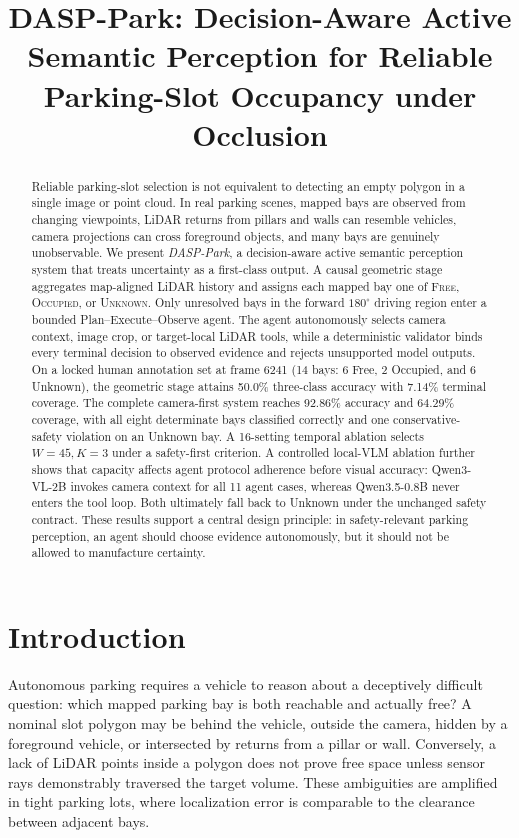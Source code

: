 \documentclass[conference]{IEEEtran}
\title{DASP-Park: Decision-Aware Active Semantic Perception for Reliable Parking-Slot Occupancy under Occlusion}
\author{\IEEEauthorblockN{Anonymous Author(s)}
\IEEEauthorblockA{Author information withheld for manuscript preparation}}
\begin{document}
\maketitle

\begin{abstract}
Reliable parking-slot selection is not equivalent to detecting an empty polygon in a single image or point cloud. In real parking scenes, mapped bays are observed from changing viewpoints, LiDAR returns from pillars and walls can resemble vehicles, camera projections can cross foreground objects, and many bays are genuinely unobservable. We present \emph{DASP-Park}, a decision-aware active semantic perception system that treats uncertainty as a first-class output. A causal geometric stage aggregates map-aligned LiDAR history and assigns each mapped bay one of \textsc{Free}, \textsc{Occupied}, or \textsc{Unknown}. Only unresolved bays in the forward $180^{\circ}$ driving region enter a bounded Plan--Execute--Observe agent. The agent autonomously selects camera context, image crop, or target-local LiDAR tools, while a deterministic validator binds every terminal decision to observed evidence and rejects unsupported model outputs. On a locked human annotation set at frame 6241 (14 bays: 6 Free, 2 Occupied, and 6 Unknown), the geometric stage attains 50.0\% three-class accuracy with 7.14\% terminal coverage. The complete camera-first system reaches 92.86\% accuracy and 64.29\% coverage, with all eight determinate bays classified correctly and one conservative-safety violation on an Unknown bay. A 16-setting temporal ablation selects $W{=}45,K{=}3$ under a safety-first criterion. A controlled local-VLM ablation further shows that capacity affects agent protocol adherence before visual accuracy: Qwen3-VL-2B invokes camera context for all 11 agent cases, whereas Qwen3.5-0.8B never enters the tool loop. Both ultimately fall back to Unknown under the unchanged safety contract. These results support a central design principle: in safety-relevant parking perception, an agent should choose evidence autonomously, but it should not be allowed to manufacture certainty.
\end{abstract}

\section{Introduction}
Autonomous parking requires a vehicle to reason about a deceptively difficult question: which mapped parking bay is both reachable and actually free? A nominal slot polygon may be behind the vehicle, outside the camera, hidden by a foreground vehicle, or intersected by returns from a pillar or wall. Conversely, a lack of LiDAR points inside a polygon does not prove free space unless sensor rays demonstrably traversed the target volume. These ambiguities are amplified in tight parking lots, where localization error is comparable to the clearance between adjacent bays.
\end{document}
